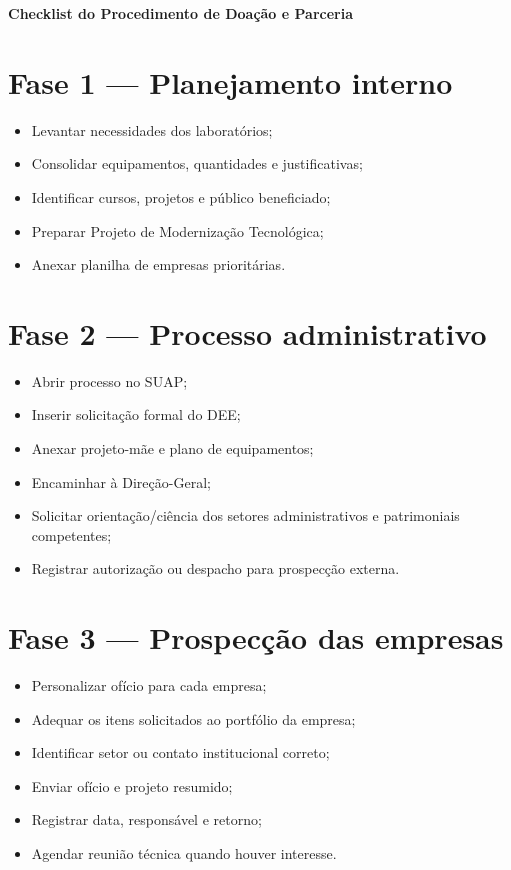 \documentclass[11pt,a4paper]{article}
\begin{document}
\cabecalhoInstitucional
\begin{center}
{\Large\bfseries\color{azulpetroleo} Checklist do Procedimento de Doação e Parceria}
\end{center}

\section{Fase 1 — Planejamento interno}
\begin{itemize}[leftmargin=*]
\item[$\square$] Levantar necessidades dos laboratórios;
\item[$\square$] Consolidar equipamentos, quantidades e justificativas;
\item[$\square$] Identificar cursos, projetos e público beneficiado;
\item[$\square$] Preparar Projeto de Modernização Tecnológica;
\item[$\square$] Anexar planilha de empresas prioritárias.
\end{itemize}

\section{Fase 2 — Processo administrativo}
\begin{itemize}[leftmargin=*]
\item[$\square$] Abrir processo no SUAP;
\item[$\square$] Inserir solicitação formal do DEE;
\item[$\square$] Anexar projeto-mãe e plano de equipamentos;
\item[$\square$] Encaminhar à Direção-Geral;
\item[$\square$] Solicitar orientação/ciência dos setores administrativos e patrimoniais competentes;
\item[$\square$] Registrar autorização ou despacho para prospecção externa.
\end{itemize}

\section{Fase 3 — Prospecção das empresas}
\begin{itemize}[leftmargin=*]
\item[$\square$] Personalizar ofício para cada empresa;
\item[$\square$] Adequar os itens solicitados ao portfólio da empresa;
\item[$\square$] Identificar setor ou contato institucional correto;
\item[$\square$] Enviar ofício e projeto resumido;
\item[$\square$] Registrar data, responsável e retorno;
\item[$\square$] Agendar reunião técnica quando houver interesse.
\end{itemize}
\end{document}
